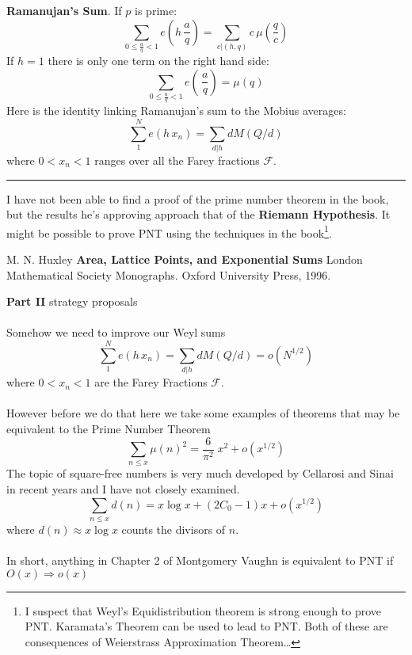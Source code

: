 \documentclass[12pt]{article}
\begin{document}
\newpage

\noindent \textbf{Ramanujan's Sum}.  If $p$ is prime:
$$ \sum_{0 \leq \frac{a}{q} < 1} e\left( h \, \frac{a}{q} \right) = \sum_{ c | (h,q)} c\,  \mu \left(\frac{q}{c}\right)$$
If $h=1$ there is only one term on the right hand side:
$$ \sum_{0 \leq \frac{a}{q} < 1} e\left(  \, \frac{a}{q} \right) = \mu(q)$$
Here is the identity linking Ramanujan's sum to the Mobius averages:
$$ \sum_1^N e( h \, x_n) =  \sum_{d | h} d M(Q/d) $$
where $0 < x_n < 1$ ranges over all the Farey fractions $\mathcal{F}$. \vspace{12pt} \hrule \vspace{12pt}
\noindent I have not been able to find a proof of the prime number theorem in the book, but the results he's approving approach that of the \textbf{Riemann Hypothesis}.  It might be possible to prove PNT using the techniques in the book\footnote{I suspect that Weyl's Equidistribution theorem is strong enough to prove PNT.  Karamata's Theorem can be used to lead to PNT.  Both of these are consequences of Weierstrass Approximation Theorem\dots}.

\selectfont \fontsize{12}{10}\selectfont

\begin{thebibliography}{}

\item M. N. Huxley \textbf{Area, Lattice Points, and Exponential Sums} London Mathematical Society Monographs.  Oxford University Press, 1996.


\end{thebibliography}

\selectfont \fontsize{25}{30}\selectfont

\noindent \textbf{Part II} strategy proposals \\ \\
Somehow we need to improve our Weyl sums 
$$ \sum_1^N e( h \, x_n) =  \sum_{d | h} d M(Q/d)  = o(N^{1/2})$$
where $0 < x_n < 1$ are the Farey Fractions $\mathcal{F}$. \\ \\
However before we do that here we take some examples of theorems that may be equivalent to the Prime Number Theorem
$$ \sum_{n \leq x} \mu(n)^2 =  \frac{6}{\pi^2} \; x^2 + o(  x^{1/2}) $$
The topic of square-free numbers is very much developed by Cellarosi and Sinai in recent years and I have not closely examined.
$$ \sum_{n \leq x} d(n)
= x \log x + (2 C_0 - 1)x + o(x^{1/2}) $$
where $d(n) \approx x \log x $ counts the divisors of $n$.  \\ \\
In short, anything in Chapter 2 of Montgomery Vaughn is equivalent to PNT if $O(x) \Longrightarrow o(x) $ 
\end{document}
